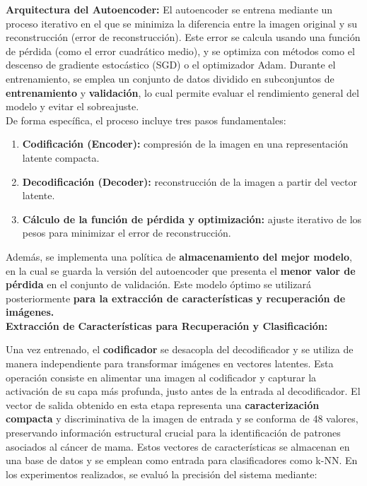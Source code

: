 \documentclass[12pt]{article} %
\begin{document}
\textbf{Arquitectura del Autoencoder:}
El autoencoder se entrena mediante un proceso iterativo en el que se minimiza la diferencia entre la imagen original y su reconstrucción (error de reconstrucción). Este error se calcula usando una función de pérdida (como el error cuadrático medio), y se optimiza con métodos como el descenso de gradiente estocástico (SGD) o el optimizador Adam. Durante el entrenamiento, se emplea un conjunto de datos dividido en subconjuntos de \textbf{entrenamiento} y \textbf{validación}, lo cual permite evaluar el rendimiento general del modelo y evitar el sobreajuste.\\

De forma específica, el proceso incluye tres pasos fundamentales:\\

\begin{enumerate}
    \item \textbf{Codificación (Encoder):} compresión de la imagen en una representación latente compacta.
    \item \textbf{Decodificación (Decoder):} reconstrucción de la imagen a partir del vector latente.
    \item \textbf{Cálculo de la función de pérdida y optimización:} ajuste iterativo de los pesos para minimizar el error de reconstrucción.
\end{enumerate}

Además, se implementa una política de \textbf{almacenamiento del mejor modelo}, en la cual se guarda la versión del autoencoder que presenta el \textbf{menor valor de pérdida} en el conjunto de validación. Este modelo óptimo se utilizará posteriormente \textbf{para la extracción de características y recuperación de imágenes.}\\


\textbf{Extracción de Características para Recuperación y Clasificación:}

Una vez entrenado, el \textbf{codificador} se desacopla del decodificador y se utiliza de manera independiente para transformar imágenes en vectores latentes. Esta operación consiste en alimentar una imagen al codificador y capturar la activación de su capa más profunda, justo antes de la entrada al decodificador. El vector de salida obtenido en esta etapa representa una \textbf{caracterización compacta} y discriminativa de la imagen de entrada y se conforma de 48 valores, preservando información estructural crucial para la identificación de patrones asociados al cáncer de mama. Estos vectores de características se almacenan en una base de datos y se emplean como entrada para clasificadores como k-NN. En los experimentos realizados, se evaluó la precisión del sistema mediante:
\end{document}
